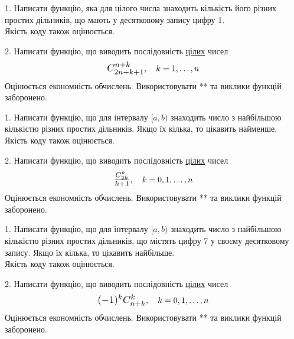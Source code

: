 \documentclass[12pt, ukrainian]{article}
\begin{document}
\begin{Large}
1. Написати функцію, яка для цілого числа знаходить кількість його різних простих дільників, що мають у десятковому запису цифру 1.\\	Якість коду також оцінюється. 



\vspace{10mm}

\newpage

2. 
Написати функцію, що виводить послідовність \underline{цілих} чисел
$$\scalebox{1.2}{$C_{2n+k+1}^{n+k}$}, \quad k=1,\ldots,n$$
Оцінюється економність обчислень. Використовувати ** та виклики функцій заборонено.

\newpage




1. Написати функцію, що для інтервалу $[a, b)$ знаходить число з найбільшою кількістю різних простих дільників. Якщо їх кілька, то цікавить найменше.\\	Якість коду також оцінюється. 



\vspace{10mm}

\newpage

2. 
Написати функцію, що виводить послідовність \underline{цілих} чисел
$$\scalebox{1.2}{$\frac{C_{2k}^k}{k+1}$}, \quad k=0,1,\ldots,n$$
Оцінюється економність обчислень. Використовувати ** та виклики функцій заборонено.

\newpage




1. Написати функцію, що для інтервалу $[a, b)$ знаходить число з найбільшою кількістю різних простих дільників, що містять цифру 7 у своєму десятковому запису. Якщо їх кілька, то цікавить найбільше.\\	Якість коду також оцінюється. 



\vspace{10mm}

\newpage

2. 
Написати функцію, що виводить послідовність \underline{цілих} чисел
$$\scalebox{1.2}{$(-1)^{k}C_{n+k}^{k}$}, \quad k=0,1,\ldots,n$$
Оцінюється економність обчислень. Використовувати ** та виклики функцій заборонено.

\newpage


\end{Large}
\end{document}
